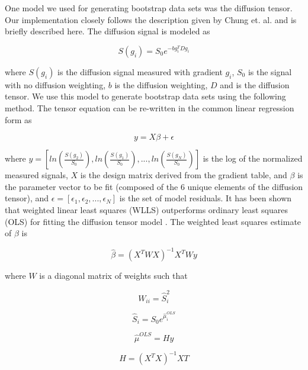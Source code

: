 One model we used for generating bootstrap data sets was the diffusion
tensor. Our implementation closely follows the description given by
Chung et. al. and is briefly described here. The diffusion signal is
modeled as

\begin{equation}
S(g_i) = S_0e^{-bg_i^TDg_i}
\end{equation}

where $S(g_i)$ is the diffusion signal measured with gradient $g_i$, $S_0$ is the signal
with no diffusion weighting, $b$ is the diffusion weighting, $D$ and is the diffusion tensor. We use this model to generate bootstrap data sets
using the following method. The tensor equation can be re-written in the
common linear regression form as

\begin{equation}
y = X\beta + \epsilon
\end{equation}

where $y=[ln(\frac{S(g_2)}{S_0}), ln(\frac{S(g_1)}{S_0}), ..., ln(\frac{S(g_N)}{S_0})]$ is the log of the normalized measured signals, $X$ is the design
matrix derived from the gradient table, and $\beta$ is the parameter vector to
be fit (composed of the 6 unique elements of the diffusion tensor), and $\epsilon = [\epsilon_1, \epsilon_2, ..., \epsilon_N]$
is the set of model residuals. It has been shown that weighted linear
least squares (WLLS) outperforms ordinary least squares (OLS) for
fitting the diffusion tensor model \cite{Veraart_2013}. The weighted least squares estimate of $\beta$ is

\begin{equation}
\hat{\beta} = (X^TWX)^{-1}X^TWy
\end{equation}

where $W$ is a diagonal matrix of weights such that

\begin{equation}
W_{ii} = \hat{S}_i^2
\end{equation}

\begin{equation}
\hat{S}_i = S_0e^{\hat{\mu}^{OLS}_i}
\end{equation}

\begin{equation}
\hat{\mu}^{OLS} = Hy
\end{equation}

\begin{equation}
H = (X^TX)^{-1}XT
\end{equation}

